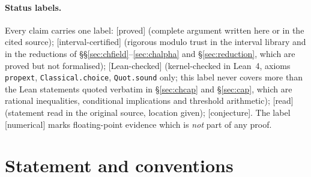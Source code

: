\documentclass[11pt,a4paper]{article}
\theoremstyle{remark}
\theoremstyle{definition}
\newcommand{\E}{\mathbb{E}}
\newcommand{\st}[1]{\textsf{[#1]}}
\newcommand{\Zb}{\bar Z}
\begin{document}
\begin{abstract}
exponential decay and a lattice mass gap, and the all-field bound $W_1(\nu_b,\nu_{b'})\le\frac14|b-b'|$ on $S^3$, were
stated publicly, with proofs, in the preprint \cite{BB26} of 18 October 2026 (Theorems~E, F and~7 there). This note
was prepared independently and makes \emph{no priority claim}. Its own contributions are the exact identification
of the one-link chordal coefficient as $\E_\kappa[x_\perp^2]$ for $\kappa\le4/3$, with the explicit remainder
$\frac14-\E_\kappa[x_\perp^2]\ge\kappa^2/(96\,\Zb(\kappa))$, the exact geodesic coefficient $8\beta/(9\pi)$ for
$\kappa\le3\pi/8$, two independent interval-arithmetic certificates, Lean-checked final steps, and an explicit
transfer of the published constants of Levin, Royer and Shen--Zhu--Zhu with their conventions.
\end{abstract}

\paragraph{Status labels.}
Every claim carries one label:
\st{proved} (complete argument written here or in the cited source);
\st{interval-certified} (rigorous modulo trust in the interval library and in the reductions of
\S\S\ref{sec:chfield}--\ref{sec:chalpha} and \S\ref{sec:reduction}, which are proved but not formalised);
\st{Lean-checked} (kernel-checked in Lean~4, axioms \texttt{propext}, \texttt{Classical.choice}, \texttt{Quot.sound} only;
this label never covers more than the Lean statements quoted verbatim in \S\ref{sec:chcap} and \S\ref{sec:cap},
which are rational inequalities, conditional implications and threshold arithmetic);
\st{read} (statement read in the original source, location given);
\st{conjecture}.
The label \st{numerical} marks floating-point evidence which is \emph{not} part of any proof.

\section{Statement and conventions}\label{sec:statement}
\end{document}
